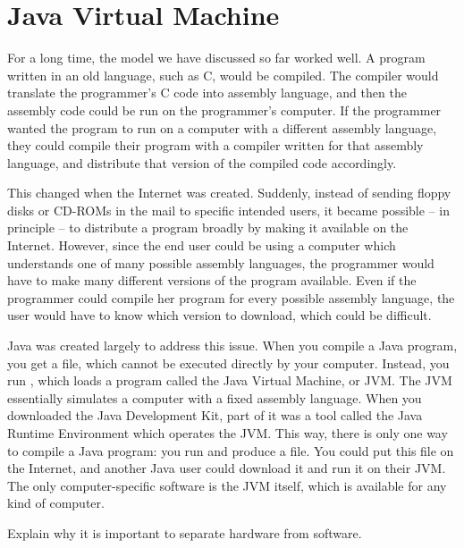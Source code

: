 \section{Java Virtual Machine}

For a long time, the model we have discussed so far worked well. A program written in an old language, such as C, would be compiled. The compiler would translate the programmer's C code into assembly language, and then the assembly code could be run on the programmer's computer. If the programmer wanted the program to run on a computer with a different assembly language, they could compile their program with a compiler written for that assembly language, and distribute that version of the compiled code accordingly.

This changed when the Internet was created. Suddenly, instead of sending floppy disks or CD-ROMs in the mail to specific intended users, it became possible -- in principle -- to distribute a program broadly by making it available on the Internet. However, since the end user could be using a computer which understands one of many possible assembly languages, the programmer would have to make many different versions of the program available. Even if the programmer could compile her program for every possible assembly language, the user would have to know which version to download, which could be difficult.

Java was created largely to address this issue. When you compile a Java program, you get a  file, which cannot be executed directly by your computer. Instead, you run , which loads a program called the Java Virtual Machine, or JVM. The JVM essentially simulates a computer with a fixed assembly language. When you downloaded the Java Development Kit, part of it was a tool called the Java Runtime Environment which operates the JVM. This way, there is only one way to compile a Java program: you run  and produce a  file. You could put this  file on the Internet, and another Java user could download it and run it on their JVM. The only computer-specific software is the JVM itself, which is available for any kind of computer.

\exercisesection

\begin{exercise}
    Explain why it is important to separate hardware from software.
\end{exercise}

